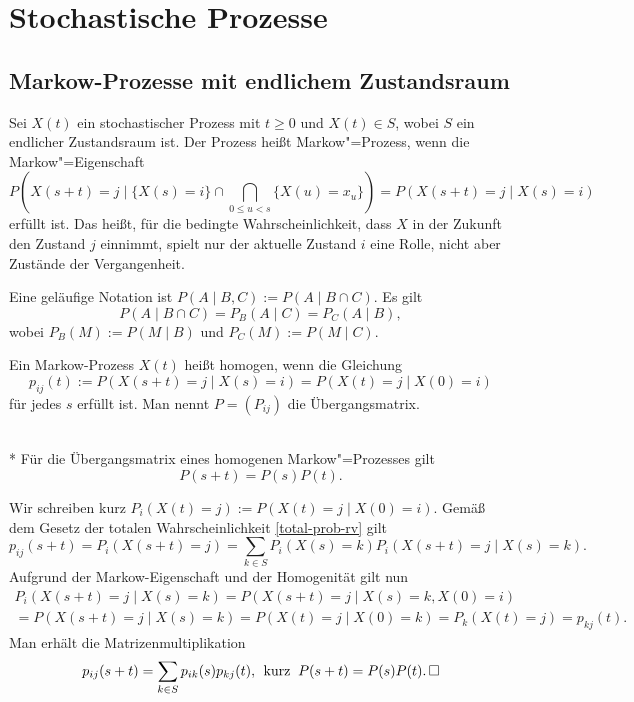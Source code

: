 \section{Stochastische Prozesse}%

\subsection{Markow-Prozesse mit endlichem Zustandsraum}

\begin{Definition}
Sei $X(t)$ ein stochastischer Prozess mit $t\ge 0$ und $X(t)\in S$,
wobei $S$ ein endlicher Zustandsraum ist. Der Prozess heißt
Markow"=Prozess, wenn die Markow"=Eigenschaft
\[P(X(s+t)=j\mid \{X(s)=i\}\cap\bigcap_{0\le u<s}\{X(u)=x_u\}) = P(X(s+t)=j\mid X(s)=i)\]
erfüllt ist. Das heißt, für die bedingte Wahrscheinlichkeit, dass
$X$ in der Zukunft den Zustand $j$ einnimmt, spielt nur der aktuelle
Zustand $i$ eine Rolle, nicht aber Zustände der Vergangenheit.
\end{Definition}

\noindent
{} Eine geläufige Notation
ist $P(A\mid B,C):=P(A\mid B\cap C).$ Es gilt
\[P(A\mid B\cap C) = P_B(A\mid C) = P_C(A\mid B),\]
wobei $P_B(M):=P(M\mid B)$ und $P_C(M):=P(M\mid C)$.

\begin{Definition}%
Ein Markow-Prozess $X(t)$ heißt homogen, wenn die Gleichung
\[p_{ij}(t) := P(X(s+t)=j\mid X(s)=i) = P(X(t)=j\mid X(0)=i)\]
für jedes $s$ erfüllt ist. Man nennt $P=(P_{ij})$ die Übergangsmatrix.
\end{Definition}

\begin{Satz}%
\mbox{}\\*
Für die Übergangsmatrix eines homogenen Markow"=Prozesses gilt
\[P(s+t) = P(s)P(t).\]
\end{Satz}

\begin{Beweis}
Wir schreiben kurz $P_i(X(t)=j):=P(X(t)=j\mid X(0)=i)$. Gemäß dem
Gesetz der totalen Wahrscheinlichkeit \ref{total-prob-rv} gilt
\[p_{ij}(s+t) = P_i(X(s+t)=j)
= \sum_{k\in S} P_i(X(s)=k) P_i(X(s+t)=j\mid X(s)=k).\]
Aufgrund der Markow-Eigenschaft und der Homogenität gilt nun
\begin{gather*}
P_i(X(s+t)=j\mid X(s)=k) = P(X(s+t)=j\mid X(s)=k, X(0)=i)\\
= P(X(s+t)=j\mid X(s)=k) = P(X(t)=j\mid X(0)=k) = P_k(X(t)=j) = p_{kj}(t).
\end{gather*}
Man erhält die Matrizenmultiplikation
\[p_{ij}(s+t) = \sum_{k\in S} p_{ik}(s) p_{kj}(t),\;\,
\text{kurz}\;\; P(s+t)=P(s)P(t).\,\square\]
\end{Beweis}

